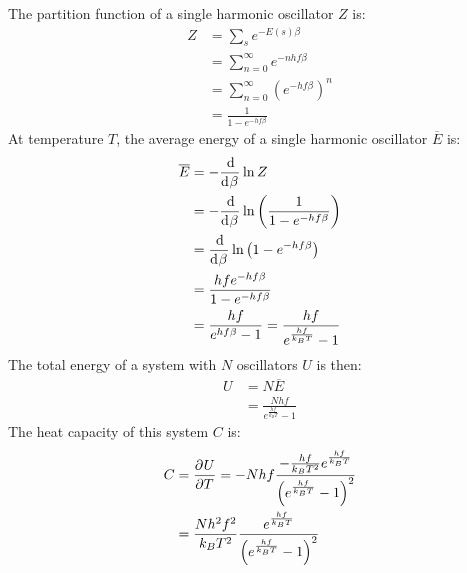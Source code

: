 \documentclass{article}
\begin{document}
The partition function of a single harmonic oscillator $Z$ is:
\begin{equation}
    \begin{split}
        Z & = \sum_s e^{-E\left(s\right)\beta} \\
        & = \sum_{n=0}^\infty e^{-nhf\beta} \\
        & = \sum_{n=0}^\infty {\left(e^{-hf\beta}\right)}^n \\
        & = \frac{1}{1 - e^{-hf\beta}}
    \end{split}
\end{equation}
At temperature $T$, the average energy of a single harmonic oscillator $\overline{E}$ is:
\begin{equation}
    \begin{split}
        \overline{E} & = -\deriv{}{\beta} \ln{Z} \\
        & = -\deriv{}{\beta} \ln{\left(\frac{1}{1 - e^{-hf\beta}}\right)} \\
        & = \deriv{}{\beta} \ln{\left(1 - e^{-hf\beta}\right)} \\
        & = \frac{hfe^{-hf\beta}}{1 - e^{-hf\beta}} \\
        & = \frac{hf}{e^{hf\beta} - 1} = \frac{hf}{e^{\frac{hf}{k_BT}} - 1} \\
    \end{split}
\end{equation}
The total energy of a system with $N$ oscillators $U$ is then:
\begin{equation}
    \begin{split}
        U & = N\overline{E} \\
        & = \frac{Nhf}{e^{\frac{hf}{k_BT}} - 1}
    \end{split}
\end{equation}
The heat capacity of this system $C$ is:
\begin{equation}
    \begin{split}
        C & = \frac{\partial^{}U} {\partial T^{}} = -Nhf\frac{-\frac{hf}{k_B T^2}e^{\frac{hf}{k_BT}}}{{\left(e^{\frac{hf}{k_BT}} - 1\right)}^2} \\
        & = \frac{Nh^2f^2}{k_BT^2}\frac{e^{\frac{hf}{k_BT}}}{{\left(e^{\frac{hf}{k_BT}} - 1\right)}^2} \\
    \end{split}
\end{equation}
\end{document}
